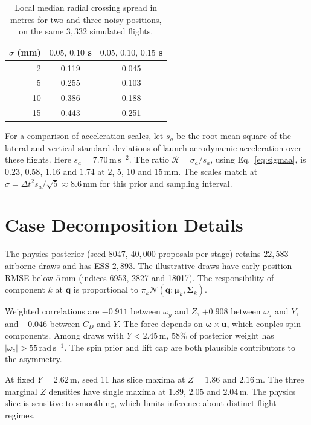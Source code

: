 \documentclass[11pt,a4paper]{article}
\begin{document}
\begin{table}[H]
  \centering
  \small
  \caption{Local median radial crossing spread in metres for two and three noisy positions, on the same $3{,}332$ simulated flights.}
  \label{tab:local-spread}
  \begin{tabular}{rcc}
    \toprule
    $\sigma$ (mm) & $0.05,\,0.10$ s & $0.05,\,0.10,\,0.15$ s \\
    \midrule
    2  & 0.119 & 0.045 \\
    5  & 0.255 & 0.103 \\
    10 & 0.386 & 0.188 \\
    15 & 0.443 & 0.251 \\
    \bottomrule
  \end{tabular}
\end{table}

For a comparison of acceleration scales, let $s_a$ be the root-mean-square of the lateral and vertical standard deviations of launch aerodynamic acceleration over these flights. Here $s_a=7.70\,\mathrm{m\,s^{-2}}$. The ratio $\mathcal R=\sigma_a/s_a$, using Eq.~\eqref{eq:sigmaa}, is $0.23$, $0.58$, $1.16$ and $1.74$ at $2$, $5$, $10$ and $15\,\mathrm{mm}$. The scales match at $\sigma=\Delta t^2s_a/\sqrt{5}\approx8.6\,\mathrm{mm}$ for this prior and sampling interval.

\section{Case Decomposition Details}
\label{app:decomp}

The physics posterior (seed 8047, $40{,}000$ proposals per stage) retains $22{,}583$ airborne draws and has ESS $2{,}893$. The illustrative draws have early-position RMSE below $5\,\mathrm{mm}$ (indices 6953, 2827 and 18017). The responsibility of component $k$ at $\mathbf q$ is proportional to $\pi_k\mathcal N(\mathbf q;\boldsymbol\mu_k,\boldsymbol\Sigma_k)$.

Weighted correlations are $-0.911$ between $\omega_y$ and $Z$, $+0.908$ between $\omega_z$ and $Y$, and $-0.046$ between $C_D$ and $Y$. The force depends on $\boldsymbol\omega\times\mathbf u$, which couples spin components. Among draws with $Y<2.45\,\mathrm{m}$, $58\%$ of posterior weight has $|\omega_z|>55\,\mathrm{rad\,s^{-1}}$. The spin prior and lift cap are both plausible contributors to the asymmetry.

At fixed $Y=2.62\,\mathrm{m}$, seed 11 has slice maxima at $Z=1.86$ and $2.16\,\mathrm{m}$. The three marginal $Z$ densities have single maxima at $1.89$, $2.05$ and $2.04\,\mathrm{m}$. The physics slice is sensitive to smoothing, which limits inference about distinct flight regimes.

% 
\end{document}
